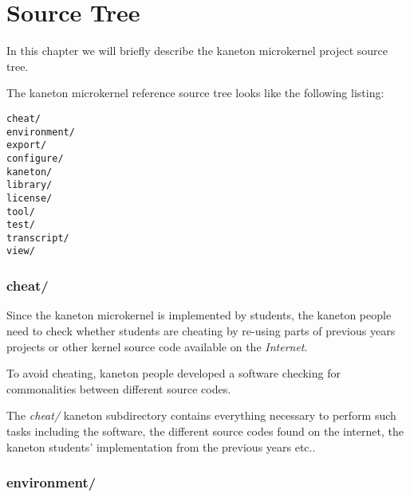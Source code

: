 %
%
%
%
%
%

%
%

\chapter{Source Tree}

In this chapter we will briefly describe the kaneton microkernel project
source tree.

\newpage

%
%

The kaneton microkernel reference source tree looks like the following
listing:

\begin{verbatim}
cheat/
environment/
export/
configure/
kaneton/
library/
license/
tool/
test/
transcript/
view/
\end{verbatim}


\subsection*{cheat/}

Since the kaneton microkernel is implemented by students, the kaneton
people need to check whether students are cheating by re-using parts of
previous years projects or other kernel source code available on the
\textit{Internet}.

To avoid cheating, kaneton people developed a software checking for
commonalities between different source codes.

The \textit{cheat/} kaneton subdirectory contains everything necessary
to perform such tasks including the software, the different source codes
found on the internet, the kaneton students' implementation from the
previous years etc..


\subsection*{environment/}

